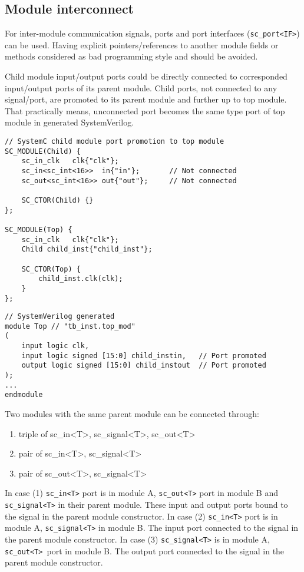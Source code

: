 \subsection{Module interconnect}

For inter-module communication signals, ports and port interfaces ({\tt sc\_port<IF>}) can be used. Having explicit pointers/references to another module fields or methods considered as bad programming style and should be avoided. 

Child module input/output ports could be directly connected to corresponded input/output ports of its parent module. Child ports, not connected to any signal/port, are promoted to its parent module and further up to top module. That practically means, unconnected port becomes the same type port of top module in generated SystemVerilog.

\begin{lstlisting}[style=mycpp]
// SystemC child module port promotion to top module
SC_MODULE(Child) {
    sc_in_clk   clk{"clk"};
    sc_in<sc_int<16>>  in{"in"};       // Not connected
    sc_out<sc_int<16>> out{"out"};     // Not connected
    
    SC_CTOR(Child) {}
};

SC_MODULE(Top) {
    sc_in_clk   clk{"clk"};
    Child child_inst{"child_inst"};
    
    SC_CTOR(Top) {
        child_inst.clk(clk);
    }
};
\end{lstlisting}
%
\begin{lstlisting}[style=myverilog]
// SystemVerilog generated
module Top // "tb_inst.top_mod"
(
    input logic clk,
    input logic signed [15:0] child_instin,   // Port promoted
    output logic signed [15:0] child_instout  // Port promoted 
);
...
endmodule
\end{lstlisting}
%
Two modules with the same parent module can be connected through:
\begin{enumerate}
\item triple of sc\_in<T>, sc\_signal<T>, sc\_out<T> 
\item pair of sc\_in<T>, sc\_signal<T> 
\item pair of sc\_out<T>, sc\_signal<T> 
\end{enumerate}
%
In case (1) {\tt sc\_in<T>} port is in module A, {\tt sc\_out<T>} port in module B and {\tt sc\_signal<T>} in their parent module. These input and output ports bound to the signal in the parent module constructor.
In case (2) {\tt sc\_in<T>} port is in module A, {\tt sc\_signal<T>} in module B. The input port connected to the signal in the parent module constructor. 
In case (3) {\tt sc\_signal<T>} is in module A, {\tt sc\_out<T> }port in module B. The output port connected to the signal in the parent module constructor. 

